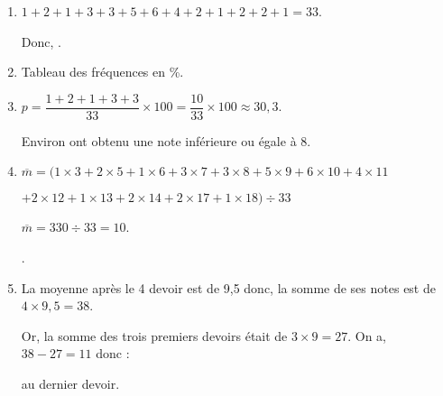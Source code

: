 \begin{Maquette}[Fiche,CorrigeFin,Colonnes=2]{}
\begin{multicols}{2}
      \begin{Solution}
         \begin{enumerate}
            \item $1+2+1+3+3+5+6+4+2+1+2+2+1 =33$. \par
               Donc, .
            \item Tableau des fréquences en \%. \par \smallskip
               \hspace*{-5mm}
               {\small
                } \smallskip
            \item $p =\dfrac{1+2+1+3+3}{33}\times100 =\dfrac{10}{33}\times100 \approx30,3$. \par \smallskip
               Environ  ont obtenu une note inférieure ou égale à 8.
            \item $\overline{m} =(1\times3+2\times5+1\times6+3\times7+3\times8+5\times9+6\times10+4\times11$ \par
               $+2\times12+1\times13+2\times14+2\times17+1\times18)\div33$ \par
               $\overline{m} =330\div33 =10$. \par
               .
            \item La moyenne après le 4 devoir est de 9,5 donc, la somme de ses notes est de $4\times9,5 =38$. \par
               Or, la somme des trois premiers devoirs était de $3\times9 =27$.  On a, $38-27 =11$ donc  : \par
                au dernier devoir.
         \end{enumerate}
      \end{Solution}

   \end{multicols}

\end{Maquette}


